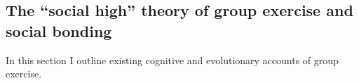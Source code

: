 \begin{CJK}{UTF8}{gbsn}


\subsection{The ``social high'' theory of group exercise and social bonding}

In this section I outline existing cognitive and evolutionary accounts of group exercise.



\end{CJK}
